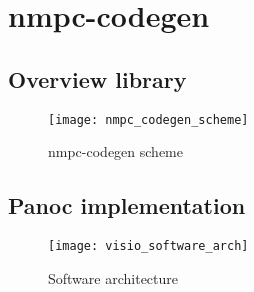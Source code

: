 \chapter{nmpc-codegen}

\section{Overview library}
	\begin{figure}[H]
		\centering
		\texttt{[image: nmpc\_codegen\_scheme]}
		\caption{nmpc-codegen scheme}
		\label{fig:nmpc-codegen scheme}
	\end{figure}

\section{Panoc implementation}
	\begin{figure}[H]
		\centering
		\texttt{[image: visio\_software\_arch]}
		\caption{Software architecture}
		\label{fig:visio software arch}
	\end{figure}
